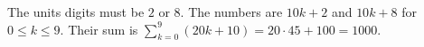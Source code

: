 The units digits must be $2$ or $8$. The numbers are $10k+2$ and $10k+8$ for $0\le k\le9$. Their sum is $\sum_{k=0}^9(20k+10)=20\cdot45+100=\boxed{1000}$.
